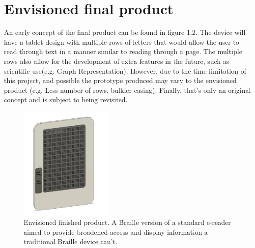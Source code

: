 \section{Envisioned final product}
An early concept of the final product can be found in figure 1.2. The device will have a tablet design with multiple rows of letters that would allow the user to read through text in a manner similar to reading through a page. The multiple rows also allow for the development of extra features in the future, such as scientific use(e.g. Graph Representation). However, due to the time limitation of this project, and possible the prototype produced may vary to the envisioned product (e.g. Less number of rows, bulkier casing). Finally, that's only an original concept and is subject to being revisited. 
\begin{figure}[h]
\centering
    \includegraphics[width=0.4\textwidth]{figures/e-reader.png}
\caption[Envisioned finished product]{Envisioned finished product. A Braille version of a standard e-reader aimed to provide broadened access and display information a traditional Braille device can't.}
\label{fig:e-reader.png}
\end{figure}


